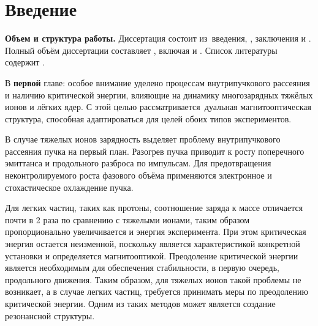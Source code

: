\chapter*{Введение}                         %

\newcommand{\actuality}{}
\newcommand{\progress}{}
\newcommand{\aim}{{\textbf\aimTXT}}
\newcommand{\tasks}{\textbf{\tasksTXT}}
\newcommand{\novelty}{\textbf{\noveltyTXT}}
\newcommand{\influence}{\textbf{\influenceTXT}}
\newcommand{\methods}{\textbf{\methodsTXT}}
\newcommand{\defpositions}{\textbf{\defpositionsTXT}}
\newcommand{\reliability}{\textbf{\reliabilityTXT}}
\newcommand{\probation}{\textbf{\probationTXT}}
\newcommand{\contribution}{\textbf{\contributionTXT}}
\newcommand{\publications}{\textbf{\publicationsTXT}}


\textbf{Объем и структура работы.} Диссертация состоит из~введения,
,
заключения и
.
%
Полный объём диссертации составляет
, включая
 и
.
Список литературы содержит
.

В \textbf{первой} главе: особое внимание уделено процессам внутрипучкового рассеяния и наличию критической энергии, влияющие на динамику многозарядных тяжёлых ионов и лёгких ядер. С этой целью рассматривается дуальная магнитооптическая структура, способная адаптироваться для целей обоих типов экспериментов.
\par В случае тяжелых ионов зарядность выделяет проблему внутрипучкового рассеяния пучка на первый план. Разогрев пучка приводит к росту поперечного эмиттанса и продольного разброса по импульсам. Для предотвращения неконтролируемого роста фазового объёма применяются электронное и стохастическое охлаждение пучка.
\par Для легких частиц, таких как протоны, соотношение заряда к массе отличается почти в 2 раза по сравнению с тяжелыми ионами, таким образом пропорционально увеличивается и энергия эксперимента. При этом критическая энергия остается неизменной, поскольку является характеристикой конкретной установки и определяется магнитооптикой. Преодоление критической энергии является необходимым для обеспечения стабильности, в первую очередь, продольного движения. Таким образом, для тяжелых ионов такой проблемы не возникает, а в случае легких частиц, требуется принимать меры по преодолению критической энергии. Одним из таких методов может является создание резонансной структуры. 

